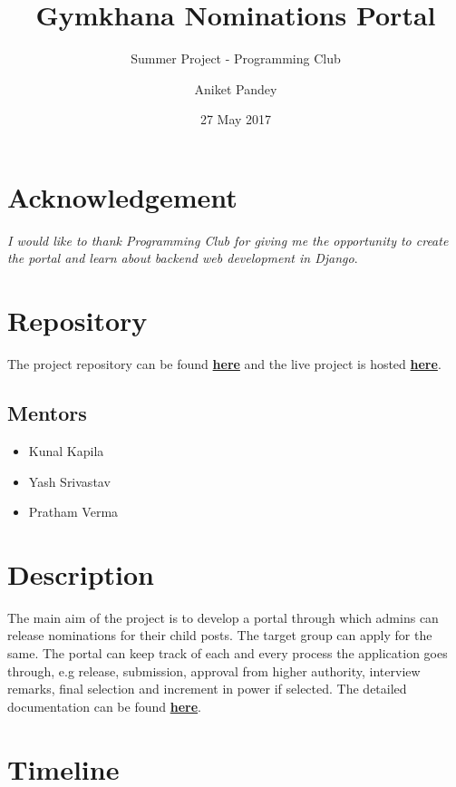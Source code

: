 \documentclass[12pt,a4paper]{scrartcl}
\title{\textbf{Gymkhana Nominations Portal}}
\subtitle{Summer Project - Programming Club}
\date{27 May 2017}
\author{Aniket Pandey}
\begin{document}
\maketitle

\section{Acknowledgement}
\textit{I would like to thank Programming Club for giving me the opportunity to create the portal and learn about backend web development in Django}.

\section{Repository}
The project repository can be found \textbf{\href{https://github.com/SummerCamp17/Gymkhana-Nominations}{here}} and the live project is hosted \textbf{\href{https://gymkhana.pythonanywhere.com}{here}}.

\subsection{Mentors}
\begin{itemize}
	\item Kunal Kapila
	\item Yash Srivastav
	\item Pratham Verma
\end{itemize}


\section{Description}
The main aim of the project is to develop a portal through which admins can release nominations for their child posts. The target group can apply for the same. The portal can keep track of each and every process the application goes through, e.g release, submission, approval from higher authority, interview remarks, final selection and increment in power if selected. The detailed documentation can be found \textbf{\href{http://aniketpandey.com/gymkhana-doc}{here}}. 

\section{Timeline}
\end{document}
